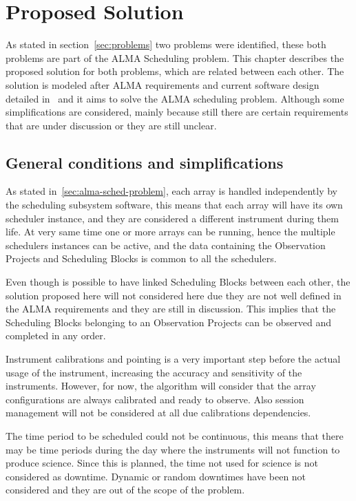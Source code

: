 \chapter{Proposed Solution}

As stated in section~\ref{sec:problems} two problems were identified, these both problems are part of the ALMA Scheduling problem.
This chapter describes the proposed solution for both problems, which are related between each other.
The solution is modeled after ALMA requirements and current software design detailed in~\cite{avarias11,clarke12,schwarz04,apdm-model} and it aims to solve the ALMA scheduling problem. Although some simplifications are considered, mainly because still there are certain requirements that are under discussion or they are still unclear. 

\section{General conditions and simplifications}

As stated in~\ref{sec:alma-sched-problem}, each array is handled independently by the scheduling subsystem software, this means that each array will have its own scheduler instance, and they are considered a different instrument during them life. At very same time one or more arrays can be running, hence the multiple schedulers instances can be active, and the data containing the Observation Projects and Scheduling Blocks is common to all the schedulers.

Even though is possible to have linked Scheduling Blocks between each other, the solution proposed here will not considered here due they are not well defined in the ALMA requirements and they are still in discussion. This implies that the Scheduling Blocks belonging to an Observation Projects can be observed and completed in any order.

Instrument calibrations and pointing is a very important step before the actual usage of the instrument, increasing the accuracy and sensitivity of the instruments. However, for now, the algorithm will consider that the array configurations are always calibrated and ready to observe. Also session management will not be considered at all due calibrations dependencies.

The time period to be scheduled could not be continuous, this means that there may be time periods during the day where the instruments will not function to produce science. Since this is planned, the time not used for science is not considered as downtime. Dynamic or random downtimes have been not considered and they are out of the scope of the problem.

